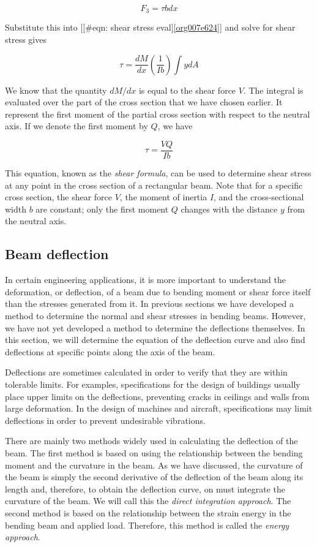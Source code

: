 \documentclass[a4paper,openany,12pt]{book}
\begin{document}
$$F_3 = \tau bdx$$

Substitute this into
[[\#eqn: shear stress eval]\ref{org007e624}] and solve for
shear stress gives

$$\tau  = \frac{dM}{dx}\left( \frac{1}{Ib} \right) \int ydA$$

We know that the quantity \(dM/dx\) is equal to the shear force \(V\). The
integral is evaluated over the part of the cross section that we have
chosen earlier. It represent the first moment of the partial cross
section with respect to the neutral axis. If we denote the first moment
by \(Q\), we have

$$\tau  = \frac{VQ}{Ib}$$

This equation, known as the \emph{shear formula}, can be used to determine
shear stress at any point in the cross section of a rectangular beam.
Note that for a specific cross section, the shear force \(V\), the moment
of inertia \(I\), and the cross-sectional width \(b\) are constant; only the
first moment \(Q\) changes with the distance \(y\) from the neutral axis.

\subsection{Beam deflection}
\label{sec:org49fb7ee}
In certain engineering applications, it is more important to understand
the deformation, or deflection, of a beam due to bending moment or shear
force itself than the stresses generated from it. In previous sections
we have developed a method to determine the normal and shear stresses in
bending beams. However, we have not yet developed a method to determine
the deflections themselves. In this section, we will determine the
equation of the deflection curve and also find deflections at specific
points along the axis of the beam.

Deflections are sometimes calculated in order to verify that they are
within tolerable limits. For examples, specifications for the design of
buildings usually place upper limits on the deflections, preventing
cracks in ceilings and walls from large deformation. In the design of
machines and aircraft, specifications may limit deflections in order to
prevent undesirable vibrations.

There are mainly two methods widely used in calculating the deflection
of the beam. The first method is based on using the relationship between
the bending moment and the curvature in the beam. As we have discussed,
the curvature of the beam is simply the second derivative of the
deflection of the beam along its length and, therefore, to obtain the
deflection curve, on must integrate the curvature of the beam. We will
call this the \emph{direct integration approach}. The second method is based
on the relationship between the strain energy in the bending beam and
applied load. Therefore, this method is called the \emph{energy approach}.
\end{document}
